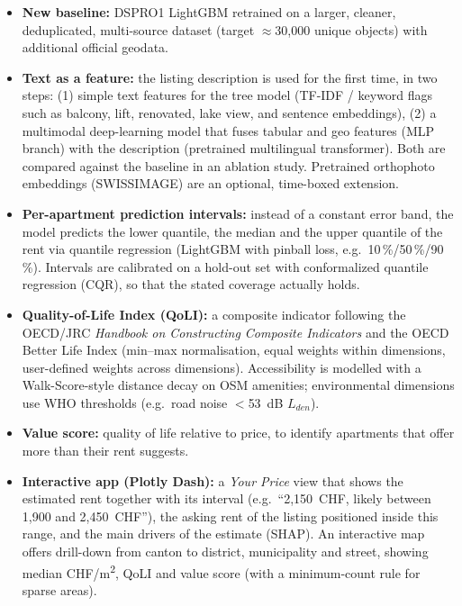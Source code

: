 \documentclass[11pt,a4paper]{article}
\begin{document}
\begin{itemize}
    \item \textbf{New baseline:} DSPRO1 LightGBM retrained on a larger, cleaner, deduplicated, multi-source dataset (target $\approx$30{,}000 unique objects) with additional official geodata.
    \item \textbf{Text as a feature:} the listing description is used for the first time, in two steps: (1) simple text features for the tree model (TF-IDF / keyword flags such as balcony, lift, renovated, lake view, and sentence embeddings), (2) a multimodal deep-learning model that fuses tabular and geo features (MLP branch) with the description (pretrained multilingual transformer). Both are compared against the baseline in an ablation study. Pretrained orthophoto embeddings (SWISSIMAGE) are an optional, time-boxed extension.
    \item \textbf{Per-apartment prediction intervals:} instead of a constant error band, the model predicts the lower quantile, the median and the upper quantile of the rent via quantile regression (LightGBM with pinball loss, e.g.\ 10\,\%/50\,\%/90\,\%). Intervals are calibrated on a hold-out set with conformalized quantile regression (CQR), so that the stated coverage actually holds.
    \item \textbf{Quality-of-Life Index (QoLI):} a composite indicator following the OECD/JRC \emph{Handbook on Constructing Composite Indicators} and the OECD Better Life Index (min--max normalisation, equal weights within dimensions, user-defined weights across dimensions). Accessibility is modelled with a Walk-Score-style distance decay on OSM amenities; environmental dimensions use WHO thresholds (e.g.\ road noise $<$53~dB $L_{den}$).
    \item \textbf{Value score:} quality of life relative to price, to identify apartments that offer more than their rent suggests.
    \item \textbf{Interactive app (Plotly Dash):} a \emph{Your Price} view that shows the estimated rent together with its interval (e.g.\ ``2{,}150~CHF, likely between 1{,}900 and 2{,}450~CHF''), the asking rent of the listing positioned inside this range, and the main drivers of the estimate (SHAP). An interactive map offers drill-down from canton to district, municipality and street, showing median CHF/m\textsuperscript{2}, QoLI and value score (with a minimum-count rule for sparse areas).
\end{itemize}
\end{document}
